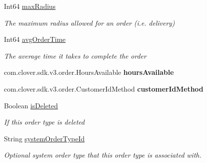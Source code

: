 \begin{DoxyCompactItemize}
Int64 \hyperlink{classcom_1_1clover_1_1sdk_1_1v3_1_1order_1_1_order_type_a40a68ca94893200a449094ead4e0b36c}{max\+Radius}
\begin{DoxyCompactList}\small\item\em The maximum radius allowed for an order (i.\+e. delivery) \end{DoxyCompactList}\item 
Int64 \hyperlink{classcom_1_1clover_1_1sdk_1_1v3_1_1order_1_1_order_type_a8e608366a9f8370cc4f9439a1f2561cd}{avg\+Order\+Time}
\begin{DoxyCompactList}\small\item\em The average time it takes to complete the order \end{DoxyCompactList}\item 
\mbox{\label{classcom_1_1clover_1_1sdk_1_1v3_1_1order_1_1_order_type_a31b60bf99eb43e3c0302d3ab9d32293f}} 
com.\+clover.\+sdk.\+v3.\+order.\+Hours\+Available {\bfseries hours\+Available}
\item 
\mbox{\label{classcom_1_1clover_1_1sdk_1_1v3_1_1order_1_1_order_type_a063b2f005d99c92308c43f3e71710d8a}} 
com.\+clover.\+sdk.\+v3.\+order.\+Customer\+Id\+Method {\bfseries customer\+Id\+Method}
\item 
Boolean \hyperlink{classcom_1_1clover_1_1sdk_1_1v3_1_1order_1_1_order_type_ac547d98bca59539fcc7ae4dc015c1201}{is\+Deleted}
\begin{DoxyCompactList}\small\item\em If this order type is deleted \end{DoxyCompactList}\item 
String \hyperlink{classcom_1_1clover_1_1sdk_1_1v3_1_1order_1_1_order_type_a3d624aaa8bb7801d62b3a1008bd18b8b}{system\+Order\+Type\+Id}
\begin{DoxyCompactList}\small\item\em Optional system order type that this order type is associated with. \end{DoxyCompactList}\item 

\end{DoxyCompactItemize}
